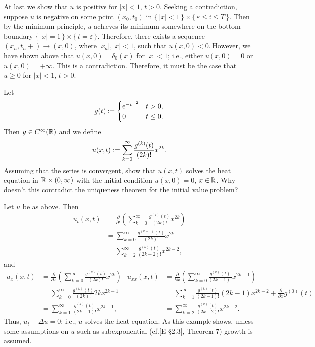 \begin{solution}
  At last we show that \(u\) is positive for \(|x|<1\), \(t>0\). Seeking a
  contradiction, suppose \(u\) is negative on some point \((x_0,t_0)\) in
  \(\{\,|x|<1\,\}\times\{\,\varepsilon\leq t\leq T\,\}\). Then by the
  minimum principle, \(u\) achieves its minimum somewhere on the bottom
  boundary \(\{\,|x|=1\,\}\times\{\,t=\varepsilon\,\}\). Therefore, there
  exists a sequence \((x_n,t_n{+})\to (x,0)\), where \(|x_n|,|x|<1\),
  such that \(u(x,0)<0\). However, we have shown above that
  \(u(x,0)=\delta_0(x)\) for \(|x|<1\); i.e., either \(u(x,0)=0\) or
  \(u(x,0)=+\infty\). This is a contradiction. Therefore, it must be the
  case that \(u\geq 0\) for \(|x|<1\), \(t>0\).
\end{solution}

\begin{problem}
  Let
  \[
    g(t)\defeq
    \begin{cases}
      \rme^{-t^{-2}}&t>0,\\
      0&t\leq 0.
    \end{cases}
  \]
  Then \(g\in C^\infty(\mathbb{R})\) and we define
  \[
    u(x,t)\defeq\sum_{k=0}^\infty\frac{g^{(k)}(t)}{(2k)!}x^{2k}.
  \]
  Assuming that the series is convergent, show that \(u(x,t)\) solves the
  heat equation in \(\mathbb{R}\times(0,\infty)\) with the initial condition
  \(u(x,0)=0\), \(x\in\mathbb{R}\). Why doesn't this contradict the uniqueness
  theorem for the initial value problem?
\end{problem}
\begin{solution}
  Let \(u\) be as above. Then
  \begin{align*}
    u_t(x,t)
    &=\frac{\partial}{\partial t}
      \left(
      \sum_{k=0}^\infty\frac{g^{(k)}(t)}{(2k)!}x^{2k}
      \right)\\
    &=\sum_{k=0}^\infty \frac{g^{(k+1)}(t)}{(2k)!}x^{2k}\\
    &=\sum_{k=2}^\infty \frac{g^{(k)}(t)}{(2k-2)!}x^{2k-2},
  \end{align*}
  and
  \begin{align*}
    u_x(x,t)
    &=\frac{\partial}{\partial x}
      \left(
      \sum_{k=0}^\infty\frac{g^{(k)}(t)}{(2k)!}x^{2k}
      \right)
    &u_{xx}(x,t)
    &=\frac{\partial}{\partial x}
      \left(
      \sum_{k=0}^\infty\frac{g^{(k)}(t)}{(2k-1)!}x^{2k-1}
      \right)\\
    &=\sum_{k=0}^\infty\frac{g^{(k)}(t)}{(2k)!} 2kx^{2k-1}
    &&=\sum_{k=1}^\infty \frac{g^{(k)}(t)}{(2k-1)!}(2k-1)x^{2k-2}
       +\tfrac{\partial}{\partial x}g^{(0)}(t)\\
    &=\sum_{k=1}^\infty\frac{g^{(k)}(t)}{(2k-1)!}x^{2k-1},
    &&=\sum_{k=2}^\infty\frac{g^{(k)}(t)}{(2k-2)!}x^{2k-2}.
  \end{align*}
  Thus, \(u_t-\Delta u=0\); i.e., \(u\) solves the heat equation. As this
  example shows, unless some assumptions on \(u\) such as subexponential
  (cf.\@ [E \S 2.3], Theorem 7) growth is assumed.
\end{solution}

